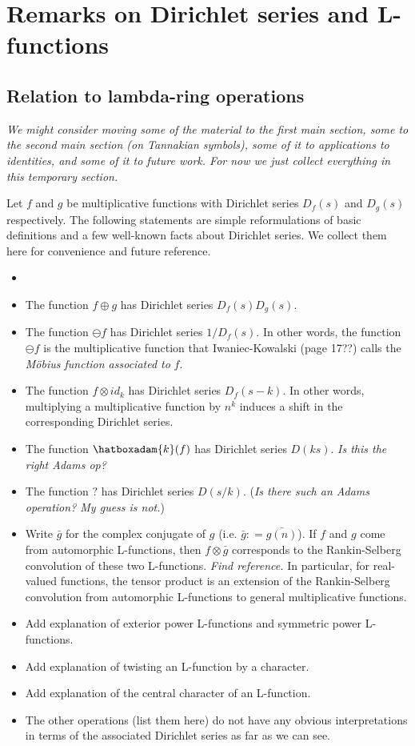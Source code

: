 
\section{Remarks on Dirichlet series and L-functions}

\subsection{Relation to lambda-ring operations}

\emph{We might consider moving some of the material to the first main section, some to the second main section (on Tannakian symbols), some of it to applications to identities, and some of it to future work. For now we just collect everything in this temporary section.}

Let $f$ and $g$ be multiplicative functions with Dirichlet series $D_f(s)$ and $D_g(s)$ respectively. The following statements are simple reformulations of basic definitions and a few well-known facts about Dirichlet series. We collect them here for convenience and future reference.
\begin{itemize}
\item {}
\item The function $f \oplus g$ has Dirichlet series $D_f(s) D_g(s)$.
\item The function $\ominus f$ has Dirichlet series $1/D_f(s)$. In other words, the function $\ominus f$ is the multiplicative function that Iwaniec-Kowalski (page 17??) calls the \emph{M{\"o}bius function associated to} $f$.
\item The function $f \otimes id_{k}$ has Dirichlet series $D_f(s-k)$. In other words, multiplying a multiplicative function by $n^k$ induces a shift in the corresponding Dirichlet series.
\item The function $\hatboxadam{k}(f)$ has Dirichlet series $D(ks)$. \emph{Is this the right Adams op?}
\item The function $?$ has Dirichlet series $D(s/k)$. (\emph{Is there such an Adams operation? My guess is not.})
\item Write $\bar{g}$ for the complex conjugate of $g$ (i.e. $\bar{g} : = \bar{g(n)} $). If $f$ and $g$ come from automorphic L-functions, then $f \otimes \bar{g}$ corresponds to the Rankin-Selberg convolution of these two L-functions. \emph{Find reference.} In particular, for real-valued functions, the tensor product is an extension of the Rankin-Selberg convolution from automorphic L-functions to general multiplicative functions.
\item Add explanation of exterior power L-functions and symmetric power L-functions.
\item Add explanation of twisting an L-function by a character.
\item Add explanation of the central character of an L-function.
\item The other operations (list them here) do not have any obvious interpretations in terms of the associated Dirichlet series as far as we can see.
\end{itemize}
